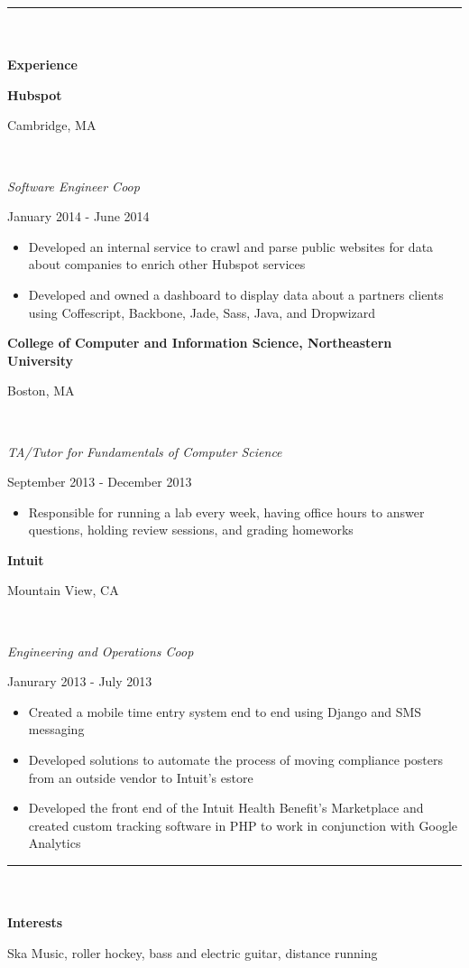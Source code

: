 \documentclass[14pt]{article}
\newcommand\textboxhalf[1]{%
  \parbox{.5\textwidth}{#1}%
}
\newcommand\textboxquarter[1]{%
  \parbox{.25\textwidth}{#1}%
}
\newcommand\textboxthreequarter[1]{%
  \parbox{.75\textwidth}{#1}%
}
\begin{document}
\noindent\rule{16.5cm}{0.4pt}
\\
\\
\noindent\textbf{\Large{Experience}}
\\
\noindent\textboxhalf{\textbf{Hubspot\hfill}}\textboxhalf{\hfill Cambridge, MA}
\\
\noindent\textboxhalf{\textit{Software Engineer Coop}\hfill}\textboxhalf{\hfill January 2014 - June 2014}
\begin{itemize} [noitemsep, nolistsep]
\item Developed an internal service to crawl and parse public websites for data about companies to enrich other Hubspot services
\item Developed and owned a dashboard to display data about a partners clients using Coffescript, Backbone, Jade, Sass, Java, and Dropwizard
\end{itemize}

\noindent\textboxthreequarter{\textbf{College of Computer and Information Science, Northeastern University\hfill}}\textboxquarter{\hfill Boston, MA}
\\
\noindent\textboxhalf{\textit{TA/Tutor for Fundamentals of Computer Science}\hfill}\textboxhalf{\hfill September 2013 - December 2013}
\begin{itemize} [noitemsep, nolistsep]
\item Responsible for running a lab every week, having office hours to answer questions, holding review sessions, and grading homeworks
\end{itemize}

\noindent\textboxthreequarter{\textbf{Intuit\hfill}}\textboxquarter{\hfill Mountain View, CA}
\\
\noindent\textboxthreequarter{\textit{Engineering and Operations Coop}\hfill}\textboxquarter{\hfill Janurary 2013 - July 2013}
\begin{itemize} [noitemsep, nolistsep]
\item Created a mobile time entry system end to end using Django and SMS messaging
\item Developed solutions to automate the process of moving compliance posters from an outside vendor to Intuit’s estore
\item Developed the front end of the Intuit Health Benefit’s Marketplace and created custom tracking software in PHP to work in conjunction with Google Analytics
\end{itemize}

\noindent\rule{16.5cm}{0.4pt}
\\
\\
\noindent\textbf{\Large{Interests}}
\\
\textboxquarter{\hfill}\textboxthreequarter{Ska Music, roller hockey, bass and electric guitar, distance running}
\end{document}
